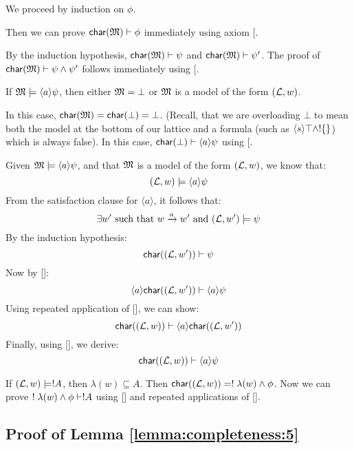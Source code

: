 \NI We proceed by induction on $\phi$.


 Then we can prove $ \mathsf{char}(\frak{M}) \vdash \phi$
immediately using axiom [.

 By the induction hypothesis, $
\mathsf{char}(\frak{M}) \vdash \psi$ and $ \mathsf{char}(\frak{M}) \vdash \psi'$.  The proof
of $ \mathsf{char}(\frak{M}) \vdash \psi \land \psi'$ follows immediately using
[.

If $\frak{M} \models \langle a \rangle \psi$, then either $\MMM = \bot$ or $\frak{M}$ is a  model of the form $(\mathcal{L},w)$.

\SUBCASE{$\MMM = \bot$} In this case, $ \mathsf{char}(\frak{M}) = \mathsf{char}(\bot) =
\bot$. (Recall, that we are overloading $\bot$ to mean both the model
at the bottom of our lattice and a formula (such as $\langle s \rangle
\top \land !\{\}$) which is always false).  In this case, $ \mathsf{char}(\bot)
\vdash \langle a \rangle \psi$ using [.

 Given $\frak{M} \models
\langle a \rangle \psi$, and that $\frak{M}$ is a model of the form
$(\mathcal{L},w)$, we know that:
\[
(\mathcal{L},w) \models \langle a \rangle \psi
\]
From the satisfaction clause for $\langle a \rangle$, it follows that:
\[
\exists w' \mbox{ such that } w \xrightarrow{a} w' \mbox { and } (\mathcal{L},w') \models \psi
\]
By the induction hypothesis:
\[
 \mathsf{char}((\mathcal{L},w')) \vdash \psi
\]
Now by []:
\[
\langle a \rangle  \mathsf{char}((\mathcal{L},w')) \vdash \langle a \rangle \psi
\]
Using repeated application of [], we can show:
\[
 \mathsf{char}((\mathcal{L},w)) \vdash \langle a \rangle  \mathsf{char}((\mathcal{L},w'))
\]
Finally, using [], we derive:
\[
 \mathsf{char}((\mathcal{L},w)) \vdash  \langle a \rangle \psi
\]

 If $(\mathcal{L},w) \models ! A$,
then $\lambda(w) \subseteq A$.  Then $ \mathsf{char}((\mathcal{L},w)) = ! \;
\lambda(w) \land \phi$.  Now we can prove $! \; \lambda(w) \land \phi
\vdash ! A$ using [] and repeated applications of
       [].

\subsection{Proof of Lemma \ref{lemma:completeness:5}}
\label{prooflemma5}


